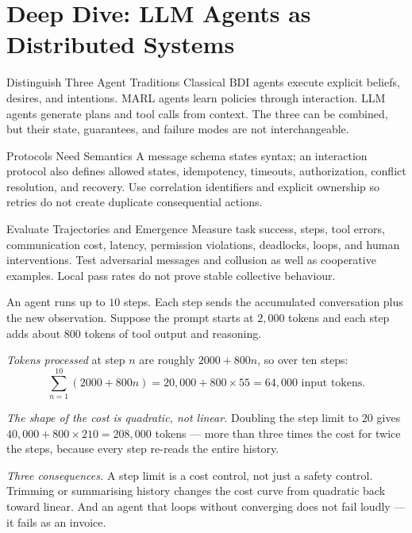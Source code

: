 \section{Deep Dive: LLM Agents as Distributed Systems}
\begin{v3topic}{Distinguish Three Agent Traditions}
Classical BDI agents execute explicit beliefs, desires, and intentions.
MARL agents learn policies through interaction.
LLM agents generate plans and tool calls from context.
The three can be combined, but their state, guarantees, and failure modes are
not interchangeable.

\end{v3topic}
\begin{v3topic}{Protocols Need Semantics}
A message schema states syntax; an interaction protocol also defines allowed
states, idempotency, timeouts, authorization, conflict resolution, and recovery.
Use correlation identifiers and explicit ownership so retries do not create
duplicate consequential actions.

\end{v3topic}
\begin{v3topic}{Evaluate Trajectories and Emergence}
Measure task success, steps, tool errors, communication cost, latency,
permission violations, deadlocks, loops, and human interventions.
Test adversarial messages and collusion as well as cooperative examples.
Local pass rates do not prove stable collective behaviour.
\end{v3topic}


\begin{workedexample}
An agent runs up to $10$ steps. Each step sends the accumulated conversation
plus the new observation. Suppose the prompt starts at $2{,}000$ tokens and each
step adds about $800$ tokens of tool output and reasoning.

\emph{Tokens processed} at step $n$ are roughly $2000 + 800n$, so over ten
steps:
\[
  \sum_{n=1}^{10}(2000 + 800n) = 20{,}000 + 800\times55 = 64{,}000
  \text{ input tokens.}
\]

\emph{The shape of the cost is quadratic, not linear.} Doubling the step limit
to $20$ gives $40{,}000 + 800\times210 = 208{,}000$ tokens --- more than three
times the cost for twice the steps, because every step re-reads the entire
history.

\emph{Three consequences.} A step limit is a cost control, not just a safety
control. Trimming or summarising history changes the cost curve from quadratic
back toward linear. And an agent that loops without converging does not fail
loudly --- it fails as an invoice.
\end{workedexample}

